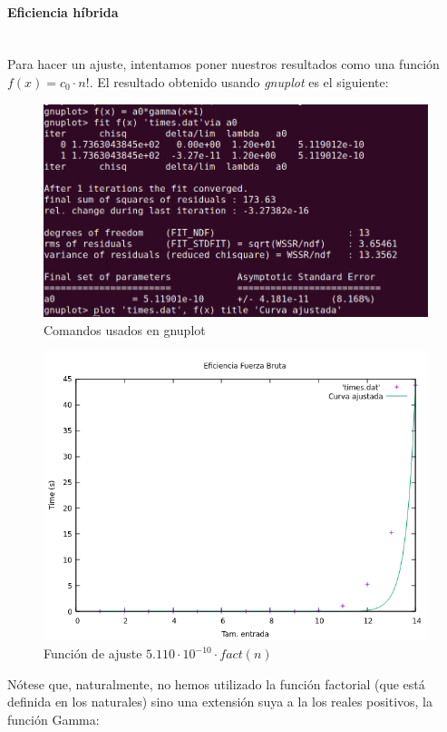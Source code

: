 \documentclass{article}
\newcommand{\myparagraph}[1]{\paragraph{#1}\mbox{}\\}
\begin{document}
\newpage
\myparagraph{Eficiencia híbrida}
Para hacer un ajuste, intentamos poner nuestros resultados como
una función $f(x) = c_{0} \cdot n!$. El resultado obtenido usando \textit{gnuplot} es el siguiente:
\newline
\begin{figure}[H]
    \centering
    \includegraphics[scale = 0.4]{P3/datos_gnu_plot.png}
    \caption{\centering Comandos usados en gnuplot}
    \label{fig:comandos_gnuplot_bf}
\end{figure}\hfill
\begin{figure}[H]
    \centering
    \includegraphics[scale = 0.4]{P3/fb_ajsute_gamma.png}
    \caption{\centering Función de ajuste $5.110\cdot10^{-10} \cdot fact(n)$}
    \label{fig:comandos_gnuplot_bf}
\end{figure}

Nótese que, naturalmente, no hemos utilizado la función 
factorial (que está definida en los naturales) sino una extensión
suya a la los reales positivos, la función Gamma:
\end{document}
